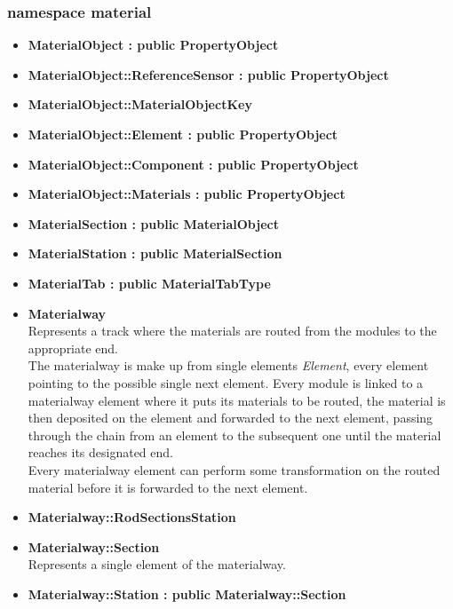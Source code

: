 \documentclass[12pt, a4paper]{article}
\begin{document}
\subsubsection{namespace material}

\begin{itemize}

\item \textbf{MaterialObject : public PropertyObject}
\item \textbf{MaterialObject::ReferenceSensor : public PropertyObject}
\item \textbf{MaterialObject::MaterialObjectKey}
\item \textbf{MaterialObject::Element : public PropertyObject}
\item \textbf{MaterialObject::Component : public PropertyObject}
\item \textbf{MaterialObject::Materials : public PropertyObject}
\item \textbf{MaterialSection : public MaterialObject}
\item \textbf{MaterialStation : public MaterialSection}
\item \textbf{MaterialTab : public MaterialTabType}

\item \textbf{Materialway}\\
Represents a track where the materials are routed from the modules to the appropriate end.\\ 
The materialway is make up from single elements \emph{Element}, every element pointing to the possible single next element. Every module is linked to a materialway element where it puts its materials to be routed, the material is then deposited on the element and forwarded to the next element, passing through the chain from an element to the subsequent one until the material reaches its designated end.\\ 
Every materialway element can perform some transformation on the routed material before it is forwarded to the next element.

\item \textbf{Materialway::RodSectionsStation}

\item \textbf{Materialway::Section}\\
Represents a single element of the materialway.

\item \textbf{Materialway::Station : public Materialway::Section}


\end{itemize}
\end{document}
